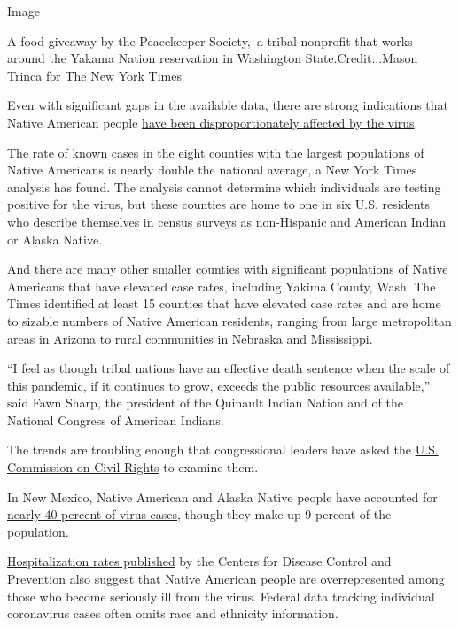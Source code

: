 Image

A food giveaway by the Peacekeeper Society,~a tribal nonprofit that
works around the Yakama Nation reservation in Washington
State.Credit...Mason Trinca for The New York Times

Even with significant gaps in the available data, there are strong
indications that Native American people
\href{https://www.nytimes3xbfgragh.onion/2020/07/30/us/native-americans-coronavirus-data.html}{have
been disproportionately affected by the virus}.

The rate of known cases in the eight counties with the largest
populations of Native Americans is nearly double the national average, a
New York Times analysis has found. The analysis cannot determine which
individuals are testing positive for the virus, but these counties are
home to one in six U.S. residents who describe themselves in census
surveys as non-Hispanic and American Indian or Alaska Native.

And there are many other smaller counties with significant populations
of Native Americans that have elevated case rates, including Yakima
County, Wash. The Times identified at least 15 counties that have
elevated case rates and are home to sizable numbers of Native American
residents, ranging from large metropolitan areas in Arizona to rural
communities in Nebraska and Mississippi.

``I feel as though tribal nations have an effective death sentence when
the scale of this pandemic, if it continues to grow, exceeds the public
resources available,'' said Fawn Sharp, the president of the Quinault
Indian Nation and of the National Congress of American Indians.

The trends are troubling enough that congressional leaders have asked
the
\href{https://www.warren.senate.gov/newsroom/press-releases/us-commission-on-civil-rights-agrees-to-warren-haaland-request-to-update-broken-promises-report-and-examine-pandemic-impacts-on-indian-country}{U.S.
Commission on Civil Rights} to examine them.

In New Mexico, Native American and Alaska Native people have accounted
for \href{https://cvprovider.nmhealth.org/public-dashboard.html}{nearly
40 percent of virus cases,} though they make up 9 percent of the
population.

\href{https://www.cdc.gov/coronavirus/2019-ncov/covid-data/covidview/index.html}{Hospitalization
rates published} by the Centers for Disease Control and Prevention also
suggest that Native American people are overrepresented among those who
become seriously ill from the virus. Federal data tracking individual
coronavirus cases often omits race and ethnicity information.

